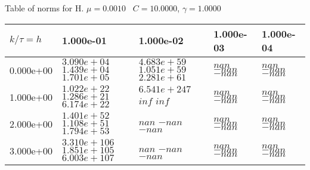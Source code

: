 \begin{center}
Table of norms for H. $\mu = 0.0010$ \, $C = 10.0000$, $\gamma = 1.0000$
  
\begin{tabular}{|p{1in}|p{1in}|p{1in}|p{1in}|p{1in}|} \hline
$k / \tau = h$ &1.000e-01 &1.000e-02 &1.000e-03 &1.000e-04 \\ \hline 
0.000e+00 & $3.090e+04$  $1.439e+04$  $1.701e+05$  & $4.683e+59$  $1.051e+59$  $2.281e+61$  & $nan$  $-nan$  $-nan$  & $nan$  $-nan$  $-nan$  \\ \hline 
1.000e+00 & $1.022e+22$  $1.286e+21$  $6.174e+22$  & $6.541e+247$  $inf$  $inf$  & $nan$  $-nan$  $-nan$  & $nan$  $-nan$  $-nan$  \\ \hline 
2.000e+00 & $1.401e+52$  $1.108e+51$  $1.794e+53$  & $nan$  $-nan$  $-nan$  & $nan$  $-nan$  $-nan$  & $nan$  $-nan$  $-nan$  \\ \hline 
3.000e+00 & $3.310e+106$  $1.851e+105$  $6.003e+107$  & $nan$  $-nan$  $-nan$  & $nan$  $-nan$  $-nan$  & $nan$  $-nan$  $-nan$  \\ \hline 

\end{tabular}\\[20pt]
\end{center}
